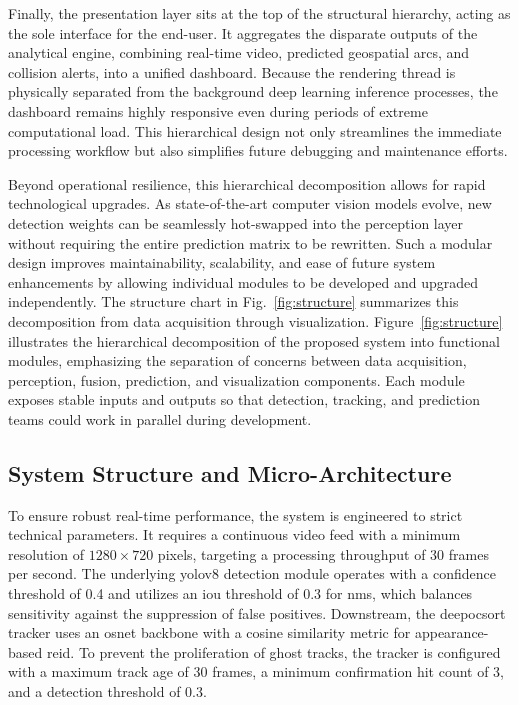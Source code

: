 Finally, the presentation layer sits at the top of the structural hierarchy, acting as the sole interface for the end-user. It aggregates the disparate outputs of the analytical engine, combining real-time video, predicted geospatial arcs, and collision alerts, into a unified dashboard. Because the rendering thread is physically separated from the background deep learning inference processes, the dashboard remains highly responsive even during periods of extreme computational load. This hierarchical design not only streamlines the immediate processing workflow but also simplifies future debugging and maintenance efforts.

\begin{reportfigblock}
Beyond operational resilience, this hierarchical decomposition allows for rapid technological upgrades. As state-of-the-art computer vision models evolve, new detection weights can be seamlessly hot-swapped into the perception layer without requiring the entire prediction matrix to be rewritten. Such a modular design improves maintainability, scalability, and ease of future system enhancements by allowing individual modules to be developed and upgraded independently. The structure chart in Fig.~\ref{fig:structure} summarizes this decomposition from data acquisition through visualization.
Figure~\ref{fig:structure} illustrates the hierarchical decomposition of the proposed system into functional modules, emphasizing the separation of concerns between data acquisition, perception, fusion, prediction, and visualization components. Each module exposes stable inputs and outputs so that detection, tracking, and prediction teams could work in parallel during development.
\end{reportfigblock}

\subsection{System Structure and Micro-Architecture}
To ensure robust real-time performance, the system is engineered to strict technical parameters. It requires a continuous video feed with a minimum resolution of $1280 \times 720$ pixels, targeting a processing throughput of 30 frames per second. The underlying \gls{yolov8} detection module operates with a confidence threshold of 0.4 and utilizes an \gls{iou} threshold of 0.3 for \gls{nms}, which balances sensitivity against the suppression of false positives. Downstream, the \gls{deepocsort} tracker uses an \gls{osnet} backbone with a cosine similarity metric for appearance-based \gls{reid}. To prevent the proliferation of ghost tracks, the tracker is configured with a maximum track age of 30 frames, a minimum confirmation hit count of 3, and a detection threshold of 0.3.

